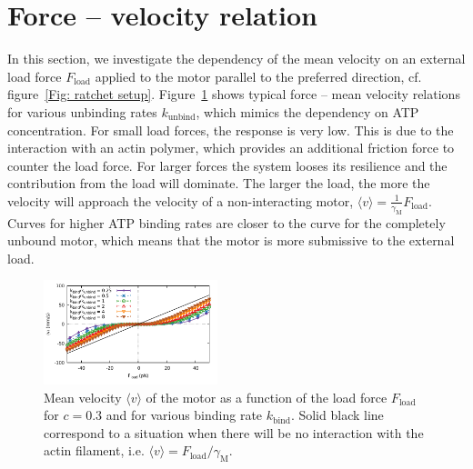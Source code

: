 \documentclass[aps,pre,twocolumn,showpacs,showkeys]{revtex4-1}
\begin{document}
\section{Force -- velocity relation}
\label{sec:force-velocity}
In this section, we investigate the dependency of the mean velocity on an external load force $F_\text{load}$ applied to the motor parallel to the preferred direction, 
cf. figure~\ref{Fig: ratchet setup}.
Figure~\ref{Fig: F_v} shows typical force -- mean velocity relations for various unbinding rates $k_\text{unbind}$, which mimics the dependency on ATP concentration.
For small load forces, the response is very low. 
This is due to the interaction with an actin polymer, which provides an additional friction force to counter the load force. 
For larger forces the system looses its resilience and the contribution from the load will dominate. 
The larger the load, the more the velocity will approach the velocity of a non-interacting motor, $\langle v \rangle = \frac{1}{\gamma_\text{M}}F_\text{load}$.
Curves for higher ATP binding rates are closer to the curve for the completely unbound motor, %
which means that the motor is more submissive to the external load.
\begin{figure}[t]
\centering
\includegraphics[width=0.45\textwidth,height=!]{F_v}
\caption{Mean velocity $\langle v \rangle$ of the motor as a function of the load force $F_\text{load}$ for $c=0.3$ and for various binding rate $k_\text{bind}$.
Solid black line correspond to a situation when there will be no interaction with the actin filament, i.e. $\langle v \rangle = F_\text{load} / \gamma_\text{M}$. 
}
\label{Fig: F_v} 
\end{figure}
\end{document}
